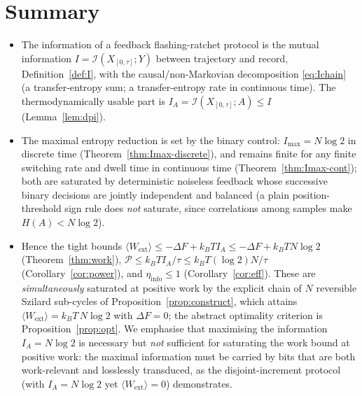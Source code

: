 \documentclass{amsart}
\theoremstyle{definition}
\newcommand{\kB}{k_{B}}
\newcommand{\Wext}{\langle W_{\mathrm{ext}}\rangle}
\begin{document}
\section*{Summary}
\begin{itemize}
\item[(a)] The information of a feedback flashing-ratchet protocol is the
mutual information $I=\mathcal I(X_{[0,\tau]};Y)$ between trajectory and
record, Definition~\ref{def:I}, with the causal/non-Markovian decomposition
\eqref{eq:Ichain} (a transfer-entropy sum; a transfer-entropy rate in
continuous time). The thermodynamically usable part is
$I_A=\mathcal I(X_{[0,\tau]};A)\le I$ (Lemma~\ref{lem:dpi}).
\item[(b)] The maximal entropy reduction is set by the binary control:
$I_{\max}=N\log2$ in discrete time (Theorem~\ref{thm:Imax-discrete}), and
remains finite for any finite switching rate and dwell time in continuous time
(Theorem~\ref{thm:Imax-cont}); both are saturated by deterministic noiseless feedback whose successive
binary decisions are jointly independent and balanced (a plain
position-threshold sign rule does \emph{not} saturate, since correlations among
samples make $H(A)<N\log2$).
\item[(c)] Hence the tight bounds
$\Wext\le -\Delta F+\kB T I_A\le -\Delta F+\kB T N\log2$
(Theorem~\ref{thm:work}),
$\mathcal P\le \kB T I_A/\tau\le \kB T(\log2)N/\tau$
(Corollary~\ref{cor:power}), and $\eta_{\mathrm{info}}\le1$
(Corollary~\ref{cor:eff}). These are \emph{simultaneously} saturated at
positive work by the explicit chain of $N$ reversible Szilard sub-cycles of
Proposition~\ref{prop:construct}, which attains $\Wext=\kB T\,N\log2$ with
$\Delta F=0$; the abstract optimality criterion is
Proposition~\ref{prop:opt}. We emphasise that maximising the information
$I_A=N\log2$ is necessary but \emph{not} sufficient for saturating the work
bound at positive work: the maximal information must be carried by bits that are
both work-relevant and losslessly transduced, as the disjoint-increment
protocol (with $I_A=N\log2$ yet $\Wext=0$) demonstrates.
\end{itemize}
\end{document}
